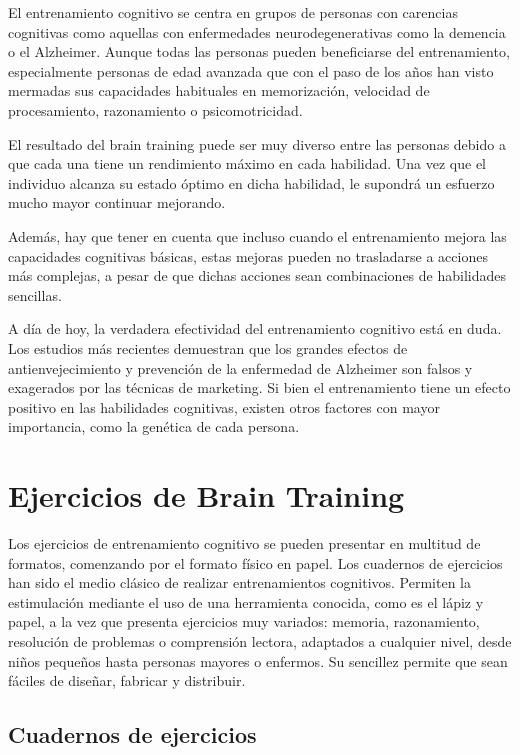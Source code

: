 El entrenamiento cognitivo se centra en grupos de personas con carencias cognitivas como aquellas con enfermedades neurodegenerativas como la demencia o el Alzheimer. Aunque todas las personas pueden beneficiarse del entrenamiento, especialmente personas de edad avanzada que con el paso de los años han visto mermadas sus capacidades habituales en memorización, velocidad de procesamiento, razonamiento o psicomotricidad.

El resultado del brain training puede ser muy diverso entre las personas debido a que cada una tiene un rendimiento máximo en cada habilidad. Una vez que el individuo alcanza su estado óptimo en dicha habilidad, le supondrá un esfuerzo mucho mayor continuar mejorando.

Además, hay que tener en cuenta que incluso cuando el entrenamiento mejora las capacidades cognitivas básicas, estas mejoras pueden no trasladarse a acciones más complejas, a pesar de que dichas acciones sean combinaciones de habilidades sencillas.

A día de hoy, la verdadera efectividad del entrenamiento cognitivo está en duda. Los estudios más recientes demuestran que los grandes efectos de antienvejecimiento y prevención de la enfermedad de Alzheimer son falsos y exagerados por las técnicas de marketing. Si bien el entrenamiento tiene un efecto positivo en las habilidades cognitivas, existen otros factores con mayor importancia, como la genética de cada persona. \cite{EA_ent_efectividad}


\section{Ejercicios de Brain Training}
\label{sec:estadoArte:ejerciciosBrainTraining}

Los ejercicios de entrenamiento cognitivo se pueden presentar en multitud de formatos, comenzando por el formato físico en papel. Los cuadernos de ejercicios han sido el medio clásico de realizar entrenamientos cognitivos. Permiten la estimulación mediante el uso de una herramienta conocida, como es el lápiz y papel, a la vez que presenta ejercicios muy variados: memoria, razonamiento, resolución de problemas o comprensión lectora, adaptados a cualquier nivel, desde niños pequeños hasta personas mayores o enfermos. Su sencillez permite que sean fáciles de diseñar, fabricar y distribuir.

\subsection{Cuadernos de ejercicios}

